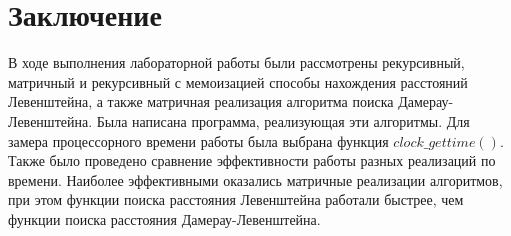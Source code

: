 \chapter*{Заключение}

В ходе выполнения лабораторной работы были рассмотрены рекурсивный, матричный и рекурсивный с мемоизацией способы нахождения расстояний Левенштейна, а также матричная реализация алгоритма поиска Дамерау-Левенштейна. Была написана программа, реализующая эти алгоритмы. Для замера процессорного времени работы была выбрана функция $clock\_gettime()$. Также было проведено сравнение эффективности работы разных реализаций по времени. Наиболее эффективными оказались матричные реализации алгоритмов, при этом функции поиска расстояния Левенштейна работали быстрее, чем функции поиска расстояния Дамерау-Левенштейна.
